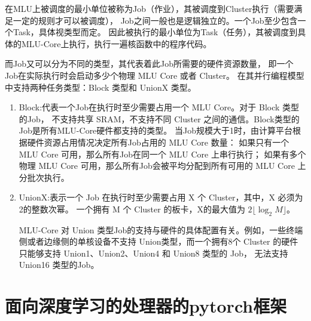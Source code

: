 在MLU上被调度的最小单位被称为Job（作业），其被调度到Cluster执行（需要满足一定的规则才可以被调度），
Job之间一般也是逻辑独立的。一个Job至少包含一个Task，具体视类型而定。
因此被执行的最小单位为Task（任务），其被调度到具体的MLU-Core上执行，执行一遍核函数中的程序代码。

而Job又可以分为不同的类型，其代表着此Job所需要的硬件资源数量，
即一个Job在实际执行时会启动多少个物理 MLU Core 或者 Cluster。
在其并行编程模型中支持两种任务类型：Block 类型和 UnionX 类型。
\begin{enumerate}

    \item{Block}:代表一个Job在执行时至少需要占用一个 MLU Core。对于 Block 类型的Job，
    不支持共享 SRAM，不支持不同 Cluster 之间的通信。Block类型的Job是所有MLU-Core硬件都支持的类型。
    当Job规模大于1时，由计算平台根据硬件资源占用情况决定所有Job占用的 MLU Core 数量：
    如果只有一个 MLU Core 可用，那么所有Job在同一个 MLU Core 上串行执行；
    如果有多个物理 MLU Core 可用，那么所有Job会被平均分配到所有可用的 MLU Core 上分批次执行。
    \item {UnionX}:表示一个 Job 在执行时至少需要占用 X 个 Cluster，其中，X 必须为2的整数次幂。
    一个拥有 M 个 Cluster 的板卡，X的最大值为 \(2\lfloor\log_2 M\rfloor\)。

    MLU-Core 对 Union 类型Job的支持与硬件的具体配置有关。例如，一些终端侧或者边缘侧的单核设备不支持 
    Union类型，而一个拥有8个 Cluster 的硬件只能够支持 Union1、Union2、Union4 和 Union8 类型的 Job，
    无法支持 Union16 类型的Job。
    

\end{enumerate}



\section{面向深度学习的处理器的pytorch框架}

